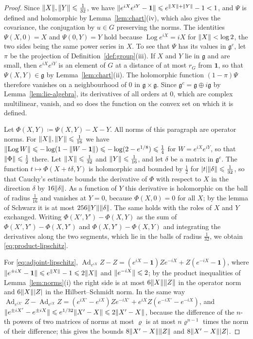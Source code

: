 \documentclass[11pt]{preprint}
\newcommand{\id}{\mathbf 1}
\newcommand{\Ad}{\operatorname{Ad}}
\DeclarePairedDelimiter{\abs}{\lvert}{\rvert}
\DeclarePairedDelimiter{\norm}{\lVert}{\rVert}
\numberwithin{equation}{section}
\begin{document}
\begin{proof}
Since $\norm X, \norm Y \leqslant \frac{1}{32}$, we have $\norm{e^{iX}e^{iY} - \id} \leqslant e^{\norm X + \norm Y} - 1 < 1$, and $\Psi$ is defined and holomorphic by Lemma~\ref{lem:chart}(iv), which also gives the covariance, the conjugation by $u \in G$ preserving the norms. The identities $\Psi(X, 0) = X$ and $\Psi(0, Y) = Y$ hold because $\operatorname{Log}e^{iX} = iX$ for $\norm X < \log 2$, the two sides being the same power series in $X$. To see that $\Psi$ has its values in $\mathfrak g^c$, let $\pi$ be the projection of Definition~\ref{def:group}(iii). If $X$ and $Y$ lie in $\mathfrak g$ and are small, then $e^{iX}e^{iY}$ is an element of $G$ at a distance of at most $r_G$ from $\id$, so that $\Psi(X, Y) \in \mathfrak g$ by Lemma~\ref{lem:chart}(ii). The holomorphic function $(1 - \pi)\Psi$ therefore vanishes on a neighbourhood of $0$ in $\mathfrak g \times \mathfrak g$. Since $\mathfrak g^c = \mathfrak g \oplus i\mathfrak g$ by Lemma~\ref{lem:lie-algebra}, its derivatives of all orders at $0$, which are complex multilinear, vanish, and so does the function on the convex set on which it is defined.

Let $\Phi(X, Y) \coloneqq \Psi(X, Y) - X - Y$. All norms of this paragraph are operator norms. For $\norm X, \norm Y \leqslant \frac{1}{16}$ we have $\norm{\operatorname{Log}W} \leqslant -\log(1 - \norm{W - \id}) \leqslant -\log(2 - e^{1/8}) \leqslant \frac{1}{4}$ for $W = e^{iX}e^{iY}$, so that $\norm\Phi \leqslant \frac{1}{2}$ there. Let $\norm X \leqslant \frac{1}{32}$ and $\norm Y \leqslant \frac{1}{16}$, and let $\delta$ be a matrix in $\mathfrak g^c$. The function $t \mapsto \Phi(X + t\delta, Y)$ is holomorphic and bounded by $\frac{1}{2}$ for $\abs t\norm\delta \leqslant \frac{1}{32}$, so that Cauchy's estimate bounds the derivative of $\Phi$ with respect to $X$ in the direction $\delta$ by $16\norm\delta$. As a function of $Y$ this derivative is holomorphic on the ball of radius $\frac{1}{16}$ and vanishes at $Y = 0$, because $\Phi(X, 0) = 0$ for all $X$; by the lemma of Schwarz it is at most $256\norm Y\norm\delta$. The same holds with the roles of $X$ and $Y$ exchanged. Writing $\Phi(X', Y') - \Phi(X, Y)$ as the sum of $\Phi(X', Y') - \Phi(X, Y')$ and $\Phi(X, Y') - \Phi(X, Y)$ and integrating the derivatives along the two segments, which lie in the balls of radius $\frac{1}{32}$, we obtain \eqref{eq:product-lipschitz}.

For \eqref{eq:adjoint-lipschitz}, $\Ad_{e^{iX}}Z - Z = (e^{iX} - \id)Ze^{-iX} + Z(e^{-iX} - \id)$, where $\norm{e^{\pm iX} - \id} \leqslant e^{\norm X} - 1 \leqslant 2\norm X$ and $\norm{e^{-iX}} \leqslant 2$; by the product inequalities of Lemma~\ref{lem:norms}(i) the right side is at most $6\norm X\norm Z$ in the operator norm and $6\norm X\abs Z$ in the Hilbert--Schmidt norm. In the same way $\Ad_{e^{iX'}}Z - \Ad_{e^{iX}}Z = (e^{iX'} - e^{iX})Ze^{-iX'} + e^{iX}Z(e^{-iX'} - e^{-iX})$, and $\norm{e^{\pm iX'} - e^{\pm iX}} \leqslant e^{1/32}\norm{X' - X} \leqslant 2\norm{X' - X}$, because the difference of the $n$-th powers of two matrices of norms at most $\varrho$ is at most $n\varrho^{n-1}$ times the norm of their difference; this gives the bounds $8\norm{X' - X}\norm Z$ and $8\norm{X' - X}\abs Z$.


\end{proof}
\end{document}
